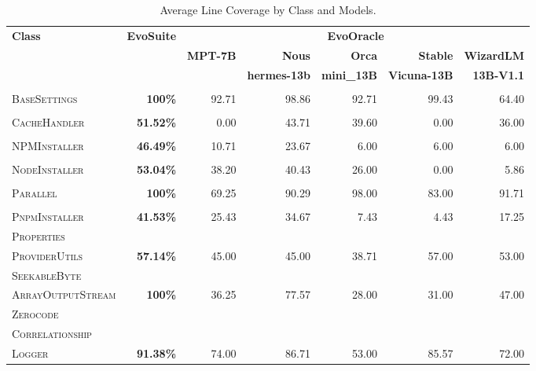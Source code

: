 \begin{table}[H]
\centering

\begin{tabular}{| l | r | r | r | r | r | r |}
\hline
\multirow{2}{*}{\textbf{Class}} & \multirow{2}{*}{\textbf{EvoSuite}} & \multicolumn{5}{c|}{\textbf{EvoOracle}} \\ %
\cline{3-7} %
 &  & \textbf{MPT-7B} & \textbf{Nous} & \textbf{Orca} & \textbf{Stable} & \textbf{WizardLM} \\
 &  &  & \textbf{hermes-13b} & \textbf{mini\_13B} & \textbf{Vicuna-13B} & \textbf{13B-V1.1} \\
\hline
\scriptsize\textsc{} &  &  &  &  &  &  \\
\scriptsize\textsc{BaseSettings} & \textbf{100\%} & 92.71 & 98.86 & 92.71 & 99.43 & 64.40 \\
\hline
\scriptsize\textsc{} &  &  &  &  &  &  \\
\scriptsize\textsc{CacheHandler} & \textbf{51.52\%} & 0.00 & 43.71 & 39.60 & 0.00 & 36.00 \\
\hline
\scriptsize\textsc{} &  &  &  &  &  &  \\
\scriptsize\textsc{NPMInstaller} & \textbf{46.49\%} & 10.71 & 23.67 & 6.00 & 6.00 & 6.00 \\
\hline
\scriptsize\textsc{} &  &  &  &  &  &  \\
\scriptsize\textsc{NodeInstaller} & \textbf{53.04\%} & 38.20 & 40.43 & 26.00 & 0.00 & 5.86 \\
\hline
\scriptsize\textsc{} &  &  &  &  &  &  \\
\scriptsize\textsc{Parallel} & \textbf{100\%} & 69.25 & 90.29 & 98.00 & 83.00 & 91.71 \\
\hline
\scriptsize\textsc{} &  &  &  &  &  &  \\
\scriptsize\textsc{PnpmInstaller} & \textbf{41.53\%} & 25.43 & 34.67 & 7.43 & 4.43 & 17.25 \\
\hline
\scriptsize\textsc{Properties} &  &  &  &  &  &  \\
\scriptsize\textsc{ProviderUtils} & \textbf{57.14\%} & 45.00 & 45.00 & 38.71 & 57.00 & 53.00 \\
\hline
\scriptsize\textsc{SeekableByte} &  &  &  &  &  &  \\
\scriptsize\textsc{ArrayOutputStream} & \textbf{100\%} & 36.25 & 77.57 & 28.00 & 31.00 & 47.00 \\
\hline
\scriptsize\textsc{Zerocode} &  &  &  &  &  &  \\
\scriptsize\textsc{Correlationship} &  &  &  &  &  &  \\
\scriptsize\textsc{Logger} & \textbf{91.38\%} & 74.00 & 86.71 & 53.00 & 85.57 & 72.00 \\
\hline

\end{tabular}
\caption{Average Line Coverage by Class and Models.\protect\footnotemark}
\label{tab:line_coverage}
\end{table}

